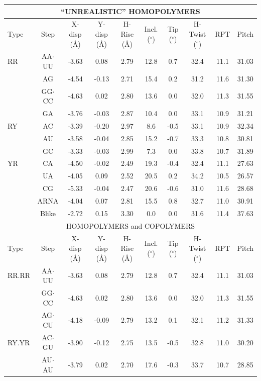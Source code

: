 \begin{table}[htbp]
\footnotesize{  
\begin{tabular}{|l|c|c|c|c|c|c|c|c|c|}
\hline
\multicolumn{ 10}{|c|}{``UNREALISTIC'' HOMOPOLYMERS} \\ \hline
Type & Step & X-disp (\AA)& Y-disp (\AA)& H-Rise (\AA)& Incl. ($^{\circ}$) & Tip ($^{\circ}$)& H-Twist ($^{\circ}$)& RPT & Pitch \\ \hline
RR & AA$\cdot$UU & -3.63 & 0.08 & 2.79 & 12.8 & 0.7 & 32.4 & 11.1 & 31.03 \\ 
 & AG & -4.54 & -0.13 & 2.71 & 15.4 & 0.2 & 31.2 & 11.6 & 31.30 \\ 
 & GG$\cdot$CC & -4.63 & 0.02 & 2.80 & 13.6 & 0.0 & 32.0 & 11.3 & 31.55 \\ 
 & GA & -3.76 & -0.03 & 2.87 & 10.4 & 0.0 & 33.1 & 10.9 & 31.21 \\ \hline
RY & AC & -3.39 & -0.20 & 2.97 & 8.6 & -0.5 & 33.1 & 10.9 & 32.34 \\ 
 & AU & -3.58 & -0.04 & 2.85 & 15.2 & -0.7 & 33.3 & 10.8 & 30.81 \\ 
 & GC & -3.33 & -0.03 & 2.99 & 7.3 & 0.0 & 33.8 & 10.7 & 31.89 \\ \hline
YR & CA & -4.50 & -0.02 & 2.49 & 19.3 & -0.4 & 32.4 & 11.1 & 27.63 \\ 
 & UA & -4.05 & 0.09 & 2.52 & 20.5 & 0.2 & 34.2 & 10.5 & 26.57 \\ 
 & CG & -5.33 & -0.04 & 2.47 & 20.6 & -0.6 & 31.0 & 11.6 & 28.68 \\ \hline
 & ARNA & -4.04 & 0.07 & 2.81 & 15.5 & 0.8 & 32.7 & 11.0 & 30.91 \\ 
 & Blike & -2.72 & 0.15 & 3.30 & 0.0 & 0.0 & 31.6 & 11.4 & 37.63 \\ \hline
\multicolumn{ 10}{|c|}{HOMOPOLYMERS and COPOLYMERS} \\ \hline
Type & Step & X-disp (\AA)& Y-disp (\AA)& H-Rise (\AA)& Incl. ($^{\circ}$)& Tip ($^{\circ}$)& H-Twist ($^{\circ}$)& RPT & Pitch \\ \hline
RR.RR & AA$\cdot$UU & -3.63 & 0.08 & 2.79 & 12.8 & 0.7 & 32.4 & 11.1 & 31.03 \\ 
 & GG$\cdot$CC & -4.63 & 0.02 & 2.80 & 13.6 & 0.0 & 32.0 & 11.3 & 31.55 \\ 
 & AG$\cdot$CU & -4.18 & -0.09 & 2.79 & 13.2 & 0.1 & 32.1 & 11.2 & 31.33 \\ \hline
RY.YR & AC$\cdot$GU & -3.90 & -0.12 & 2.75 & 13.5 & -0.5 & 32.8 & 11.0 & 30.20 \\ 
 & AU$\cdot$AU & -3.79 & 0.02 & 2.70 & 17.6 & -0.3 & 33.7 & 10.7 & 28.85 \\ 

\end{tabular}}
\end{table}
